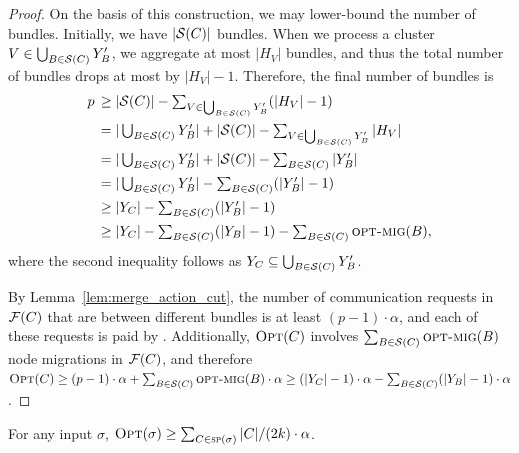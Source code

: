 \begin{proof}
On the basis of this construction, we may lower-bound the number of 
bundles. Initially, we have $|\mathcal{S}(C)|$ bundles. When we process a cluster $V \in 
\bigcup_{B \in \mathcal{S}(C)} Y'_B$, we aggregate at most $|H_V|$ bundles, and thus
the total number of bundles drops at most by $|H_V|-1$. Therefore, the final number of bundles 
is 
\begin{align*}
	p \,
	\geq &\; \textstyle |\mathcal{S}(C)| - \sum_{V \in \bigcup_{B \in \mathcal{S}(C)} Y'_B} (|H_V|-1) \\
	= &\; \textstyle |\bigcup_{B \in \mathcal{S}(C)} Y'_B| + \textstyle |\mathcal{S}(C)| - \sum_{V \in \bigcup_{B \in \mathcal{S}(C)} Y'_B} |H_V| \\
	= &\; \textstyle |\bigcup_{B \in \mathcal{S}(C)} Y'_B| + \textstyle |\mathcal{S}(C)| - \sum_{B \in \mathcal{S}(C)} |Y'_B| \\
	= &\; \textstyle |\bigcup_{B \in \mathcal{S}(C)} Y'_B| - \sum_{B \in \mathcal{S}(C)} (|Y'_B| - 1) \\
	\geq &\; \textstyle |Y_C| - \sum_{B \in \mathcal{S}(C)} (|Y'_B| - 1) \\
	\geq &\; \textstyle |Y_C| - \sum_{B \in \mathcal{S}(C)} (|Y_B|-1) - \sum_{B \in \mathcal{S}(C)} \textsc{opt-mig}(B),
\end{align*}
where the second inequality follows as $Y_C \subseteq \bigcup_{B \in \mathcal{S}(C)} Y'_B$.

By Lemma~\ref{lem:merge_action_cut}, the number of communication requests in
$\mathcal{F}(C)$ that are between different bundles is at least $(p-1) \cdot \alpha$,
and each of these requests is paid by \OPT.
Additionally, $\textsc{Opt}(C)$ involves $\sum_{B \in \mathcal{S}(C)}
\textsc{opt-mig}(B)$ node migrations in $\mathcal{F}(C)$, and therefore $\textsc{Opt}(C) \geq (p-1) \cdot
\alpha + \sum_{B \in \mathcal{S}(C)} \textsc{opt-mig}(B) \cdot \alpha
\geq (|Y_C|-1) \cdot \alpha - \sum_{B \in \mathcal{S}(C)} (|Y_B|-1) \cdot \alpha$.
\end{proof}



\begin{lemma}
\label{lem:opt_lower_bound}
For any input $\sigma$, $\textsc{Opt}(\sigma) \geq \sum_{C \in \textsc{sp}(\sigma)}
|C| / (2k) \cdot \alpha$.
\end{lemma}

